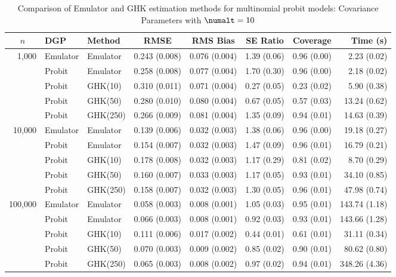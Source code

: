 \begin{table}[htbp]
\centering
\footnotesize
\begin{tabular}{@{}rllrrrrr@{}}
\toprule
\multicolumn{1}{c}{$n$} & \multicolumn{1}{l}{DGP} & \multicolumn{1}{l}{Method} & \multicolumn{1}{c}{RMSE} & \multicolumn{1}{c}{RMS Bias} & \multicolumn{1}{c}{SE Ratio} & \multicolumn{1}{c}{Coverage} & \multicolumn{1}{r}{Time (s)} \\
\midrule
\multirow{5}{*}{1,000} & Emulator & Emulator & 0.243 (0.008) & 0.076 (0.004) & 1.39 (0.06) & 0.96 (0.00) & 2.23 (0.02) \\
 & Probit & Emulator & 0.258 (0.008) & 0.077 (0.004) & 1.70 (0.30) & 0.96 (0.00) & 2.18 (0.02) \\
 & Probit & GHK(10) & 0.310 (0.011) & 0.071 (0.004) & 0.27 (0.05) & 0.23 (0.02) & 5.90 (0.38) \\
 & Probit & GHK(50) & 0.280 (0.010) & 0.080 (0.004) & 0.67 (0.05) & 0.57 (0.03) & 13.24 (0.62) \\
 & Probit & GHK(250) & 0.266 (0.009) & 0.081 (0.004) & 1.35 (0.09) & 0.94 (0.01) & 14.63 (0.39) \\
\midrule
\multirow{5}{*}{10,000} & Emulator & Emulator & 0.139 (0.006) & 0.032 (0.003) & 1.38 (0.06) & 0.96 (0.00) & 19.18 (0.27) \\
 & Probit & Emulator & 0.154 (0.007) & 0.032 (0.003) & 1.47 (0.09) & 0.96 (0.01) & 16.79 (0.21) \\
 & Probit & GHK(10) & 0.178 (0.008) & 0.032 (0.003) & 1.17 (0.29) & 0.81 (0.02) & 8.70 (0.29) \\
 & Probit & GHK(50) & 0.160 (0.007) & 0.033 (0.003) & 1.17 (0.05) & 0.93 (0.01) & 34.10 (0.85) \\
 & Probit & GHK(250) & 0.158 (0.007) & 0.032 (0.003) & 1.30 (0.05) & 0.96 (0.01) & 47.98 (0.74) \\
\midrule
\multirow{5}{*}{100,000} & Emulator & Emulator & 0.058 (0.003) & 0.008 (0.001) & 1.05 (0.03) & 0.95 (0.01) & 143.74 (1.18) \\
 & Probit & Emulator & 0.066 (0.003) & 0.008 (0.001) & 0.92 (0.03) & 0.93 (0.01) & 143.66 (1.28) \\
 & Probit & GHK(10) & 0.111 (0.006) & 0.017 (0.002) & 0.44 (0.01) & 0.61 (0.01) & 31.11 (0.34) \\
 & Probit & GHK(50) & 0.070 (0.003) & 0.009 (0.002) & 0.85 (0.02) & 0.90 (0.01) & 80.62 (0.80) \\
 & Probit & GHK(250) & 0.065 (0.003) & 0.008 (0.002) & 0.97 (0.02) & 0.94 (0.01) & 348.26 (4.36) \\
\bottomrule
\end{tabular}
\caption{Comparison of Emulator and GHK estimation methods for multinomial probit models: Covariance Parameters with $\numalt=10$}
\label{tab:emulator_vs_ghk:10:covariance}
\end{table}